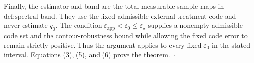 Finally, the estimator and band are the total measurable sample maps in \(\text{def:spectral-band}\).  They use the fixed admissible external treatment code and never estimate \(q_0\).  The condition \(\varepsilon_{\mathrm{app}}<\varepsilon_0\le\varepsilon_\star\) supplies a nonempty admissible-code set and the contour-robustness bound while allowing the fixed code error to remain strictly positive.  Thus the argument applies to every fixed \(\varepsilon_0\) in the stated interval.  Equations (3), (5), and (6) prove the theorem. \(\square\)